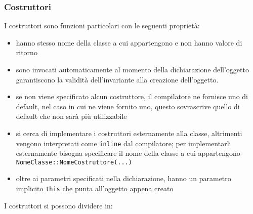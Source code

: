 \documentclass[a4paper]{article}
\begin{document}
\subsubsection*{Costruttori}
I costruttori sono funzioni particolari con le seguenti proprietà:
\begin{itemize}
	\item hanno stesso nome della classe a cui appartengono e non hanno valore di ritorno
	\item sono invocati automaticamente al momento della dichiarazione dell'oggetto garantiscono la validità dell'invariante
	alla creazione dell'oggetto.
	\item se non viene specificato alcun costruttore, il compilatore ne fornisce uno di default, nel caso in cui ne viene fornito
	uno, questo sovrascrive quello di default che non sarà più utilizzabile
	\item si cerca di implementare i costruttori esternamente alla classe, altrimenti vengono interpretati come \verb|inline|
	dal compilatore; per implementarli esternamente bisogna specificare il nome della classe a cui appartengono \verb|NomeClasse::NomeCostruttore(...)|
	\item oltre ai parametri specificati nella dichiarazione, hanno un parametro implicito \verb|this| che punta all'oggetto
	appena creato
\end{itemize}
I costruttori si possono dividere in:
\end{document}
